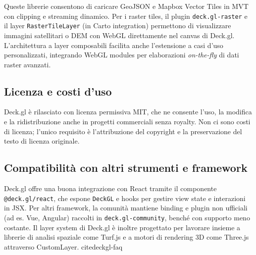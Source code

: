 Queste librerie consentono di caricare GeoJSON e Mapbox Vector Tiles in MVT con clipping e streaming dinamico\cite{deckgl-vector,deckgl-mvtlayer}.  
Per i raster tiles, il plugin \texttt{deck.gl-raster} e il layer \texttt{RasterTileLayer} (in Carto integration) permettono di visualizzare immagini satellitari o DEM con WebGL direttamente nel canvas di Deck.gl.  
L'architettura a layer composabili facilita anche l'estensione a casi d'uso personalizzati, integrando WebGL modules per elaborazioni \textit{on-the-fly} di dati raster avanzati\cite{deckgl-maptiler,deckgl-raster-plugin}.  

\subsection{Licenza e costi d'uso}  
Deck.gl è rilasciato con licenza permissiva MIT, che ne consente l'uso, la modifica e la ridistribuzione anche in progetti commerciali senza royalty. \cite{deckgl-license}  
Non ci sono costi di licenza; l'unico requisito è l'attribuzione del copyright e la preservazione del testo di licenza originale.  

\subsection{Compatibilità con altri strumenti e framework}  
Deck.gl offre una buona integrazione con React tramite il componente \texttt{@deck.gl/react}, che espone \texttt{DeckGL} e hooks per gestire view state e interazioni in JSX. \cite{deckgl-react}  
Per altri framework, la comunità mantiene binding e plugin non ufficiali (ad es. Vue, Angular) raccolti in \texttt{deck.gl-community}, benché con supporto meno costante. \cite{deckgl-community}
Il layer system di Deck.gl è inoltre progettato per lavorare insieme a librerie di analisi spaziale come Turf.js e a motori di rendering 3D come Three.js attraverso CustomLayer. cite{deckgl-faq}

\newpage